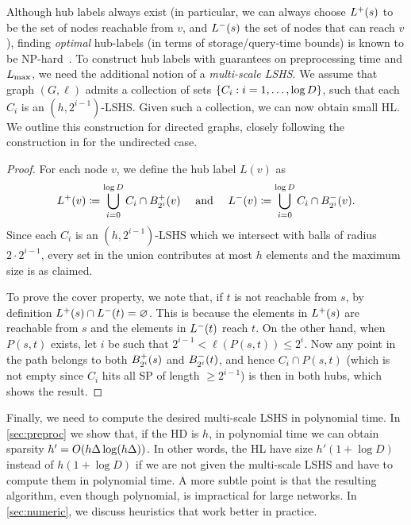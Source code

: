 Although hub labels always exist (in particular, we can always choose $\Lf(s)$ to be the set of nodes reachable from $v$, and $\Lb(s)$ the set of nodes that can reach $v$), finding \emph{optimal} hub-labels (in terms of storage/query-time bounds) is known to be NP-hard~\cite{babenko_hl_complexity}.
To construct hub labels with guarantees on preprocessing time and $\Lm$, we need the additional notion of a \emph{multi-scale LSHS}. 
We assume that graph $(G,\ell)$ admits a collection of sets $\crl*{C_i: i=1,\ldots,\log D}$, such that each $C_i$ is an $(h,2^{i-1})$-LSHS.
Given such a collection, we can now obtain small HL.
We outline this construction for directed graphs, closely following the construction in \cite[Theorem 5.1]{highway2013} for the undirected case.
\begin{proof}
For each node $v$, we define the hub label $L(v)$ as
\[
\Lf(v)\defeq  \bigcup_{i=0}^{\log D}C_i\cap \Bf_{2^i}(v) \quad\text{ and }\quad
\Lb(v)\defeq \bigcup_{i=0}^{\log D}C_i\cap \Bb_{2^i}(v).
\]
Since each $C_i$ is an $(h,2^{i-1})$-LSHS which we intersect with balls of radius $2\cdot 2^{i-1}$, every set in the union contributes at most $h$ elements and the maximum size is as claimed.

To prove the cover property, we note that, if $t$ is not reachable from $s$, by definition $\Lf(s)\cap\Lb(t)=\varnothing$.
This is because the elements in $\Lf(s)$ are reachable from $s$ and the elements in $\Lb(t)$ reach $t$.
On the other hand, when $P(s,t)$ exists, let $i$ be such that $2^{i-1}<\ell(P(s,t))\leq 2^i$.
Now any point in the path belongs to both $\Bf_{2^i}(s)$ and $\Bb_{2^i}(t)$, and hence $C_i\cap P(s,t)$  (which is not empty since $C_i$ hits all SP of length $\geq 2^{i-1}$) is then in both hubs, which shows the result.
\end{proof}


Finally, we need to compute the desired multi-scale LSHS in polynomial time.
In \cref{sec:preproc} we show that, if the HD is $h$, in polynomial time we can obtain sparsity $h'=\Or(h\Delta\log(h\Delta))$.
In other words, the HL have size $h'(1+\log D)$ instead of $h(1+\log D)$ if we are not given the multi-scale LSHS and have to compute them in polynomial time.
A more subtle point is that the resulting algorithm, even though polynomial, is impractical for large networks.
In \cref{sec:numeric}, we discuss heuristics that work better in practice.